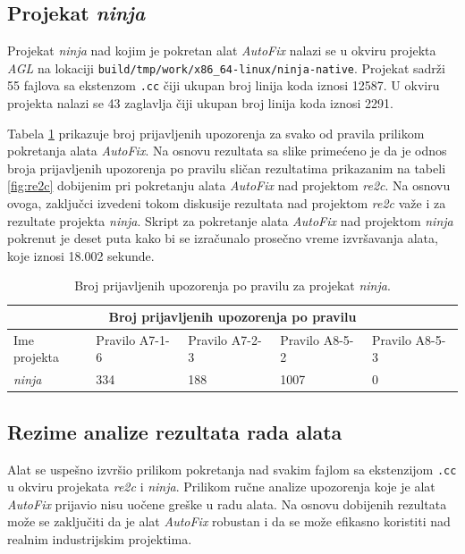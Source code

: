 \documentclass[12pt,oneside]{memoir}
\begin{document}
\subsection{Projekat \textit{ninja}}

Projekat \textit{ninja} nad kojim je pokretan alat \textit{AutoFix} nalazi se u okviru projekta \textit{AGL} na lokaciji \texttt{build/tmp/work/x86\_64-linux/ninja-native}. Projekat sadr\v{z}i 55 fajlova sa ekstenzom \texttt{.cc} \v{c}iji ukupan broj linija koda iznosi 12587. U okviru projekta
nalazi se 43 zaglavlja \v{c}iji ukupan broj linija koda iznosi 2291. \par
Tabela \ref{fig:ninja} prikazuje broj prijavljenih upozorenja za svako od pravila prilikom pokretanja alata \textit{AutoFix}.
Na osnovu rezultata sa slike prime\'{c}eno je da je odnos broja prijavljenih upozorenja po pravilu sli\v{c}an rezultatima prikazanim na tabeli \ref{fig:re2c} dobijenim pri pokretanju alata \textit{AutoFix} nad projektom \textit{re2c}. Na osnovu ovoga, zaklju\v{c}ci izvedeni tokom diskusije rezultata nad projektom \textit{re2c} va\v{z}e i za rezultate projekta \textit{ninja}. Skript za pokretanje alata \textit{AutoFix} nad projektom \textit{ninja} pokrenut je deset puta kako bi se izra\v{c}unalo prose\v{c}no vreme izvr\v{s}avanja alata, koje iznosi 18.002 sekunde.\par
\begin{table}[!h]
\begin{center}
\begin{tabular}{ |p{3cm}||p{2cm}|p{2cm}|p{2cm}|p{2cm}|  }
 \hline
 \multicolumn{5}{|c|}{Broj prijavljenih upozorenja po pravilu} \\
 \hline
 Ime projekta & Pravilo A7-1-6 & Pravilo A7-2-3 & Pravilo A8-5-2 & Pravilo A8-5-3\\
 \hline
 \textit{ninja}   & 334            & 188             & 1007            & 0\\
 \hline
\end{tabular}
\caption{Broj prijavljenih upozorenja po pravilu za projekat \textit{ninja}.}
\label{fig:ninja}
\end{center}
\end{table}

\subsection{Rezime analize rezultata rada alata}
Alat se uspe\v{s}no izvr\v{s}io prilikom pokretanja nad svakim fajlom sa ekstenzijom \texttt{.cc} u okviru projekata \textit{re2c} i \textit{ninja}. Prilikom ru\v{c}ne analize upozorenja koje je alat \textit{AutoFix} prijavio nisu uo\v{c}ene gre\v{s}ke u radu alata. Na osnovu dobijenih rezultata mo\v{z}e se zaklju\v{c}iti da je alat \textit{AutoFix} robustan i da se mo\v{z}e efikasno koristiti nad realnim industrijskim projektima.
\end{document}
